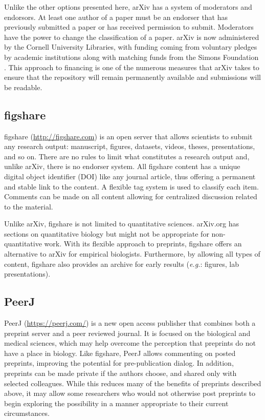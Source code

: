 \documentclass[10pt]{article}
\begin{document}
Unlike the other options presented here, arXiv has a system of moderators 
and endorsors. At least one author of a paper must be an endorser that has 
previously submitted a paper or has received permission to submit. 
Moderators have the power to change the classification of a paper. 
arXiv is now administered by the Cornell University Libraries, with funding 
coming from voluntary pledges by academic institutions along with matching 
funds from the Simons Foundation \cite{arxiv_future}. This approach to 
financing is one of the numerous measures that arXiv takes to ensure that 
the repository will remain permanently available and submissions will be 
readable.

\subsection*{figshare}

figshare (\href{http://figshare.com}{http://figshare.com}) is an open server
that allows scientists to submit any research output: manuscript, figures,
datasets, videos, theses, presentations, and so on. There are no rules to limit
what constitutes a research output and, unlike arXiv, there is no endorser
system. All figshare content has a unique digital object identifier (DOI) like
any journal article, thus offering a permanent and stable link to the content.
A flexible tag system is used to classify each item. Comments can be made on all
content allowing for centralized discussion related to the material.

Unlike arXiv, figshare is not limited to quantitative sciences. arXiv.org has
sections on quantitative biology but might not be appropriate for
non-quantitative work. With its flexible approach to preprints, figshare offers
an alternative to arXiv for empirical biologists. Furthermore, by allowing all
types of content, figshare also provides an archive for early results
(\emph{e.g.}: figures, lab presentations).

\subsection*{PeerJ}

PeerJ (\href{https://peerj.com/}{https://peerj.com/}) is a new open access
publisher that combines both a preprint server and a peer reviewed journal.  It
is focused on the biological and medical sciences, which may help overcome the
perception that preprints do not have a place in biology. Like figshare, PeerJ
allows commenting on posted preprints, improving the potential for
pre-publication dialog. In addition, preprints can be made private if the
authors choose, and shared only with selected colleagues. While this reduces
many of the benefits of preprints described above, it may allow some researchers
who would not otherwise post preprints to begin exploring the possibility in a
manner appropriate to their current circumstances.
\end{document}
